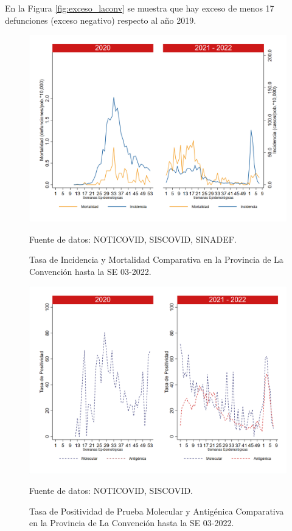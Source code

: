 \documentclass[12pt,a4paper,openany]{book}
\begin{document}
		
	En la Figura \ref{fig:exceso_laconv} se muestra que hay exceso de menos 17 defunciones (exceso negativo) respecto al año 2019.
		
		\begin{figure}[h]
			\caption{Tasa de Incidencia y Mortalidad Comparativa en la Provincia de La Convención hasta la SE 03-2022.}\label{fig:inc_mort_laconv}
			\begin{center}
				\includegraphics[width=0.7\linewidth]{../figuras/incidencia_mortalidad_20_21_9.png}
			\end{center}
			{\footnotesize {Fuente de datos: NOTICOVID, SISCOVID, SINADEF.}}
		\end{figure}
		
		\begin{figure}[h]
			\caption{Tasa de Positividad de Prueba Molecular y Antigénica Comparativa en la Provincia de La Convención hasta la SE 03-2022.}\label{fig:positividad_laconv}
			\begin{center}
				\includegraphics[width=0.7\linewidth]{../figuras/positividad_20_21_9.png}
			\end{center}
			{\footnotesize {Fuente de datos: NOTICOVID, SISCOVID.}}
		\end{figure}
		
\end{document}
